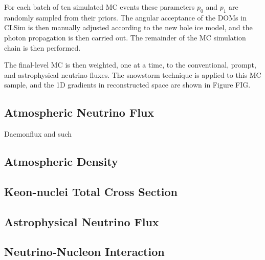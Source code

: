 \documentclass[main.tex]{subfiles}
\begin{document}
For each batch of ten simulated MC events these parameters $p_{0}$ and $p_{1}$ are randomly sampled from their priors. 
The angular acceptance of the DOMs in CLSim is then manually adjusted according to the new hole ice model, and the photon propagation is then carried out. 
The remainder of the MC simulation chain is then performed.

The final-level MC is then weighted, one at a time, to the conventional, prompt, and astrophysical neutrino fluxes. 
The snowstorm technique is applied to this MC sample, and the 1D gradients in reconstructed space are shown in Figure FIG. 

\subsection{Atmospheric Neutrino Flux}

Daemonflux and such

\subsection{Atmospheric Density}

\subsection{Keon-nuclei Total Cross Section}

\subsection{Astrophysical Neutrino Flux}

\subsection{Neutrino-Nucleon Interaction}
\end{document}
